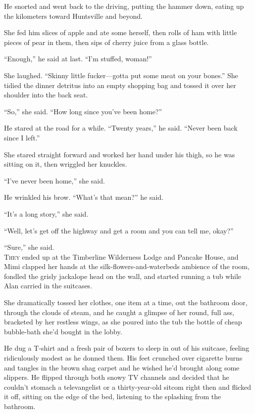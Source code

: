 \documentclass{article}
\begin{document}
He snorted and went back to the driving, putting the hammer down,
eating up the kilometers toward Huntsville and beyond.

She fed him slices of apple and ate some herself, then rolls of ham
with little pieces of pear in them, then sips of cherry juice from a
glass bottle.

``Enough,'' he said at last.  ``I'm stuffed, woman!''

She laughed.  ``Skinny little fucker---gotta put some meat on your
bones.'' She tidied the dinner detritus into an empty shopping bag and
tossed it over her shoulder into the back seat.

``So,'' she said.  ``How long since you've been home?''

He stared at the road for a while.  ``Twenty years,'' he said. 
``Never been back since I left.''

She stared straight forward and worked her hand under his thigh, so he
was sitting on it, then wriggled her knuckles.

``I've never been home,'' she said.

He wrinkled his brow.  ``What's that mean?'' he said.

``It's a long story,'' she said.

``Well, let's get off the highway and get a room and you can tell me,
okay?''

``Sure,'' she said.
\\
\lettrine[lines=3, lhang=.5, nindent=0pt, findent=2pt]{T}{hey} ended up at the Timberline Wilderness Lodge and Pancake House,
and Mimi clapped her hands at the silk-flowers-and-waterbeds ambience
of the room, fondled the grisly jackalope head on the wall, and
started running a tub while Alan carried in the suitcases.

She dramatically tossed her clothes, one item at a time, out the
bathroom door, through the clouds of steam, and he caught a glimpse of
her round, full ass, bracketed by her restless wings, as she poured
into the tub the bottle of cheap bubble-bath she'd bought in the
lobby.

He dug a T-shirt and a fresh pair of boxers to sleep in out of his
suitcase, feeling ridiculously modest as he donned them.  His feet
crunched over cigarette burns and tangles in the brown shag carpet and
he wished he'd brought along some slippers.  He flipped through both
snowy TV channels and decided that he couldn't stomach a televangelist
or a thirty-year-old sitcom right then and flicked it off, sitting on
the edge of the bed, listening to the splashing from the bathroom.
\end{document}
